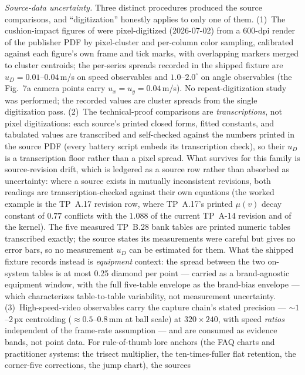 \emph{Source-data uncertainty.} Three distinct procedures produced the
source comparisons, and ``digitization'' honestly applies to only one of
them. (1)~The cushion-impact figures of \citet{mathavan2010cushion} were
pixel-digitized (2026-07-02) from a 600-dpi  render of the
publisher PDF by pixel-cluster and per-column color sampling, calibrated
against each figure's own frame and tick marks, with overlapping markers
merged to cluster centroids; the per-series spreads recorded in the
shipped fixture are $u_D = 0.01$--$0.04$\,m/s on speed observables and
$1.0$--$2.0^\circ$ on angle observables (the Fig.~7a camera points carry
$u_x = u_y = 0.04$\,m/s). No repeat-digitization study was performed; the
recorded values are cluster spreads from the single digitization pass.
(2)~The technical-proof comparisons are \emph{transcriptions}, not pixel
digitizations: each source's printed closed forms, fitted constants, and
tabulated values are transcribed and self-checked against the numbers
printed in the source PDF (every battery script embeds its transcription
check), so their $u_D$ is a transcription floor rather than a pixel
spread. What survives for this family is source-revision drift, which is
ledgered as a source row rather than absorbed as uncertainty: where a
source exists in mutually inconsistent revisions, both readings are
transcription-checked against their own equations (the worked example is
the TP~A.17 revision row, where TP~A.17's printed $\mu(v)$ decay
constant of $0.77$ conflicts with the $1.088$ of the current TP~A-14
revision and of the kernel). The five measured TP~B.28 bank tables are
printed numeric tables transcribed exactly; the source states its
measurements were careful but gives no error bars, so no measurement
$u_D$ can be estimated for them. What the shipped fixture records
instead is \emph{equipment} context: the spread between the two
on-system tables is at most 0.25 diamond per point --- carried as a
brand-agnostic equipment window, with the full five-table envelope as
the brand-bias envelope --- which characterizes table-to-table
variability, not measurement uncertainty.
(3)~High-speed-video observables carry the capture chain's stated
precision --- ${\sim}1$--2\,px centroiding ($\approx 0.5$--$0.8$\,mm at
ball scale) at $320\times240$, with speed \emph{ratios} independent of
the frame-rate assumption --- and are consumed as evidence bands, not
point data. For rule-of-thumb lore anchors (the FAQ charts and
practitioner systems: the trisect multiplier, the ten-times-fuller flat
retention, the corner-five corrections, the jump chart), the sources
